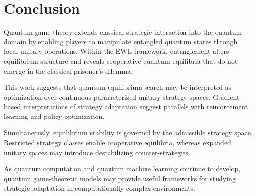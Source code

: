 \section{Conclusion}

Quantum game theory extends classical strategic interaction into the quantum domain by enabling players to manipulate entangled quantum states through local unitary operations. Within the EWL framework, entanglement alters equilibrium structure and reveals cooperative quantum equilibria that do not emerge in the classical prisoner's dilemma.

This work suggests that quantum equilibrium search may be interpreted as optimization over continuous parameterized unitary strategy spaces. Gradient-based interpretations of strategy adaptation suggest parallels with reinforcement learning and policy optimization.

Simultaneously, equilibrium stability is governed by the admissible strategy space. Restricted strategy classes enable cooperative equilibria, whereas expanded unitary spaces may introduce destabilizing counter-strategies.

As quantum computation and quantum machine learning continue to develop, quantum game-theoretic models may provide useful frameworks for studying strategic adaptation in computationally complex environments.